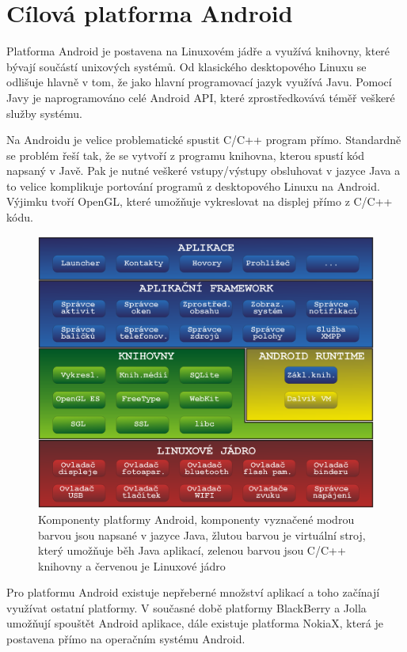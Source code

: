 \documentclass[11pt,twoside,a4paper]{book}
\begin{document}
\section{Cílová platforma Android}
Platforma Android je postavena na Linuxovém jádře a využívá knihovny, které bývají součástí unixových systémů. Od klasického desktopového Linuxu se odlišuje hlavně v tom, že jako hlavní programovací jazyk využívá Javu. Pomocí Javy je naprogramováno celé Android API, které zprostředkovává téměř veškeré služby systému.

Na Androidu je velice problematické spustit C/C++ program přímo. Standardně se problém řeší tak, že se vytvoří z programu knihovna, kterou spustí kód napsaný v Javě. Pak je nutné veškeré vstupy/výstupy obsluhovat v jazyce Java a to velice komplikuje portování programů z desktopového Linuxu na Android. Výjimku tvoří OpenGL, které umožňuje vykreslovat na displej přímo z C/C++ kódu.

\begin{center}
\begin{figure}[h!]
\includegraphics[width=120mm]{figures/android.png}
\caption{Komponenty platformy Android, komponenty vyznačené modrou barvou jsou napsané v jazyce Java, žlutou barvou je virtuální stroj, který umožňuje běh Java aplikací, zelenou barvou jsou C/C++ knihovny a červenou je Linuxové jádro}
\end{figure}
\end{center}

Pro platformu Android existuje nepřeberné množství aplikací a toho začínají využívat ostatní platformy. V současné době platformy BlackBerry a Jolla umožňují spouštět Android aplikace, dále existuje platforma NokiaX, která je postavena přímo na operačním systému Android.
\end{document}
